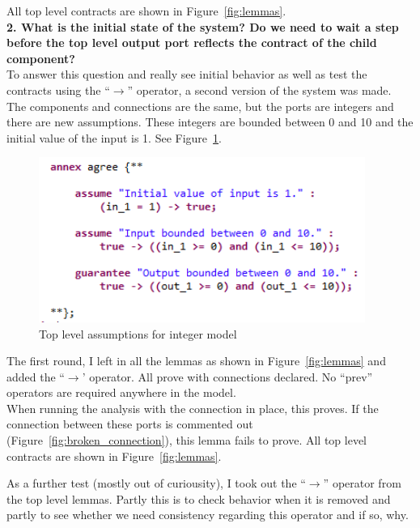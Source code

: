 \documentclass{article}
\begin{document}
All top level contracts are shown in Figure~\ref{fig:lemmas}. \\

\textbf{2. What is the initial state of the system? Do we need to wait a step before the top level output port reflects the contract of the child component?}\\

To answer this question and really see initial behavior as well as test the contracts using the ``$\rightarrow$'' operator, a second version of the system was made. The components and connections are the same, but the ports are integers and there are new assumptions. These integers are bounded between 0 and 10 and the initial value of the input is 1. See Figure~\ref{fig:assume}.\\

\begin{figure}[h]
\begin{center}
\includegraphics[width=0.95\textwidth]{images/toplevelassumptions} 
\caption{Top level assumptions for integer model}
\label{fig:assume}
\end{center}
\end{figure}

The first round, I left in all the lemmas as shown in Figure~\ref{fig:lemmas} and added the ``$\rightarrow$' operator. All prove with connections declared. No ``prev''  operators are required anywhere in the model.\\

When running the analysis with the connection in place, this proves. If the connection between these ports is commented out (Figure~\ref{fig:broken_connection}), this lemma fails to prove. All top level contracts are shown in Figure~\ref{fig:lemmas}. 

As a further test (mostly out of curiousity), I took out the ``$\rightarrow$'' operator from the top level lemmas. Partly this is to check behavior when it is removed and partly to see whether we need consistency regarding this operator and if so, why. 
\end{document}
